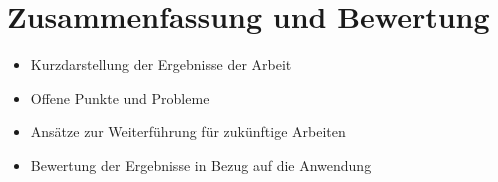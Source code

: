 %

\chapter{Zusammenfassung und Bewertung}\label{ch:zusammenfassung}
\begin{itemize}
	\item Kurzdarstellung der Ergebnisse der Arbeit
	\item Offene Punkte und Probleme
	\item Ansätze zur Weiterführung für zukünftige Arbeiten
	\item Bewertung der Ergebnisse in Bezug auf die Anwendung
\end{itemize}
